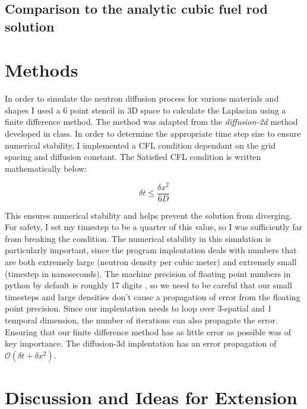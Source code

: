 \documentclass[letterpaper, 12pt]{article}
\begin{document}
      \subsection{Comparison to the analytic cubic fuel rod solution}

    \section{  Methods}
      In order to simulate the neutron diffusion process for various materials and shapes I used a 6 point stencil in 3D space to calculate the Laplacian using a finite difference method. The method was adapted from the \textit{diffusion-2d} method developed in class. In order to determine the appropriate time step size to ensure numerical stability, I implemented a CFL condition dependant on the grid spacing and diffusion constant. The Satisfied CFL condition is written mathematically below:
      
      \begin{equation}
         \delta t \le \frac{\delta x^2}{6D}
      \end{equation}

      This ensures numerical stability and helps prevent the solution from diverging. For safety, I set my timestep to be a quarter of this value, so I was sufficiently far from breaking the condition. The numerical stability in this simulation is particularly important, since the program implentation deals with numbers that are both extremely large (neutron density per cubic meter) and extremely small (timestep in nanoseconds). The machine precision of floating point numbers in python by default is
      roughly 17 digits \cite{Python-Floating-Point-Error}, so we need to be careful that our small timesteps and large densities don't cause a propagation of error from the floating point precision. Since our implentation needs to loop over 3-spatial and 1 temporal dimension, the number of iterations can also propagate the error. Ensuring that our finite difference method has as little error as possible was of key importance. The diffusion-3d implentation has an error propagation of $\mathcal{O} (\delta t + \delta x^2)$.\\

   \section{   Discussion and Ideas for Extension}
\end{document}
